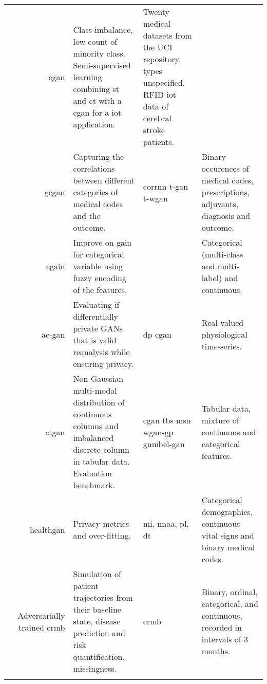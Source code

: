 \begin{center}
\begin{longtable}[l]{@{}p{}Rp{0.25\textwidth}Mp{0.20\textwidth}@{}}
        \citeauthor{Yang_2019_cdss} & \gls{cgan}
        & Class imbalance, low count of minority class. Semi-supervised learning combining \gls{st} and \gls{ct} with a \gls{cgan} for a \gls{iot} application.
        & Twenty medical datasets from the UCI repository, types unspecified. RFID \gls{iot} data of cerebral stroke patients.\\
        
        \citeauthor{Yang_2019_ehr} & \gls{gcgan}
        & Capturing the correlations between different categories of medical codes and the outcome.  & \gls{corrnn} \gls{t-gan} \gls{t-wgan}
        & Binary occurences of medical codes, prescriptions, adjuvants, diagnosis and outcome.\\
        
        \citeauthor{Yang_2019_impute_ehr} & \gls{cgain}
        & Improve on \gls{gain} for categorical variable using fuzzy encoding of the features. &
        & Categorical (multi-class and multi-label) and continuous.\\
        
        \citeauthor{Beaulieu-Jones2019-ct} & \gls{ac-gan} 
        & Evaluating if differentially private GANs that is valid reanalysis while ensuring privacy. & \gls{dp} \gls{cgan}
        & Real-valued physiological time-series.\\
        
        \citeauthor{Xu2019-ay} & \gls{ctgan}
        & Non-Gaussian multi-modal distribution of continuous columns and imbalanced discrete column in tabular data. Evaluation benchmark. & \gls{cgan} \gls{tbs} \gls{msn} \gls{wgan-gp} \gls{gumbel-gan}
        & Tabular data, mixture of continuous and categorical features.\\
        
        \citeauthor{yale2019ESANN} & \gls{healthgan}
        & Privacy metrics and over-fitting. & \gls{mi}, \gls{nnaa}, \gls{pl}, \gls{dt}
        & Categorical demographics, continuous vital signs and binary medical codes.\\
        
        \citeauthor{Fisher2019} & Adversarially trained \gls{crmb}
        & Simulation of patient trajectories from their baseline state, disease prediction and risk quantification, missingness.  & \gls{crmb}
        &  Binary, ordinal, categorical, and continuous, recorded in intervals of 3 months.\\
        
        \hline
         & & & \\
        \hline
        

\end{longtable}
\end{center}
